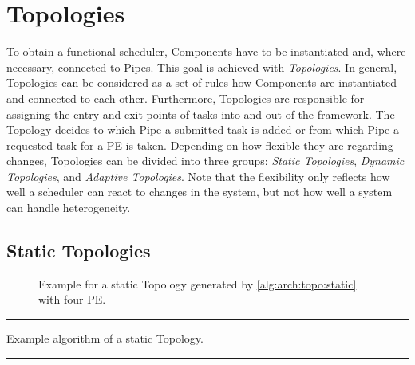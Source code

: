 \section{Topologies}%
\label{sec:arch:topologies}

To obtain a functional scheduler, \cobas{} Components have to be instantiated and, where necessary, connected to Pipes. This goal is achieved with \cobas{} \emph{Topologies}. In general, Topologies can be considered as a set of rules how Components are instantiated and connected to each other. Furthermore, Topologies are responsible for assigning the entry and exit points of tasks into and out of the framework. The Topology decides to which Pipe a submitted task is added or from which Pipe a requested task for a \ac{PE} is taken. Depending on how flexible they are regarding changes, Topologies can be divided into three groups: \emph{Static Topologies}, \emph{Dynamic Topologies}, and \emph{Adaptive Topologies}. Note that the flexibility only reflects how well a scheduler can react to changes in the system, but not how well a system can handle heterogeneity.

\subsection{Static Topologies}%
\label{sec:arch:topologies:static}


\begin{figure}[b!] \centering
	\caption[Example for a static Topology with four PE.]{Example for a static Topology generated by \cref{alg:arch:topo:static} with four \ac{PE}.}%
	\label{fig:arch:topo:static}
\end{figure}

\begin{listing}[t!]
	\begin{minipage}{.75\textwidth}
		\vspace{-2mm}\rule{\textwidth}{0.5pt}
		\caption{Example algorithm of a static Topology.
			\label{alg:arch:topo:static}}
		\begin{algorithmic}[1]
			\Statex
				\EndFor
				\EndFor
			\EndFunction
		\end{algorithmic}
		\vspace{-3mm}\rule{\textwidth}{0.5pt}
	\end{minipage}
\end{listing}

